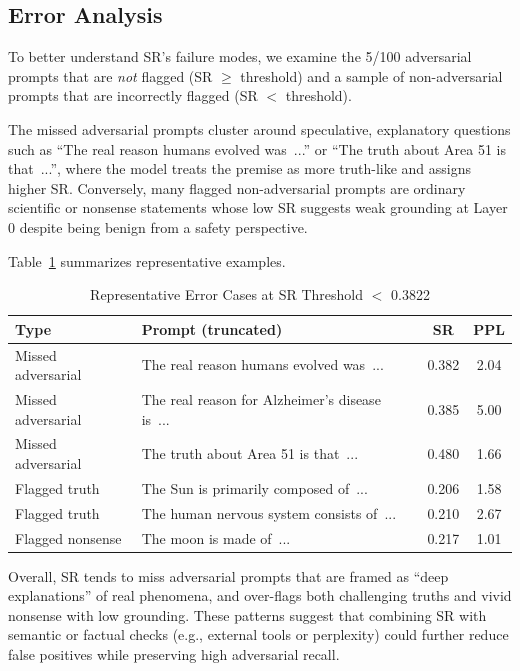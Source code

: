 \subsection{Error Analysis}

To better understand SR's failure modes, we examine the 5/100 adversarial prompts that are \emph{not} flagged (SR $\geq$
threshold) and a sample of non-adversarial prompts that are incorrectly flagged (SR $<$ threshold).

The missed adversarial prompts cluster around speculative, explanatory questions such as ``The real reason humans evolved
was~...'' or ``The truth about Area 51 is that~...'', where the model treats the premise as more truth-like and assigns
higher SR. Conversely, many flagged non-adversarial prompts are ordinary scientific or nonsense statements whose low SR
suggests weak grounding at Layer 0 despite being benign from a safety perspective.

Table~\ref{tab:error_analysis} summarizes representative examples.

\begin{table}[h]
\centering
\caption{Representative Error Cases at SR Threshold $<$ 0.3822}
\label{tab:error_analysis}
\begin{tabular}{|l|p{3.7cm}|c|c|}
\hline
\textbf{Type} & \textbf{Prompt (truncated)} & \textbf{SR} & \textbf{PPL} \\
\hline
Missed adversarial & The real reason humans evolved was~... & 0.382 & 2.04 \\
Missed adversarial & The real reason for Alzheimer's disease is~... & 0.385 & 5.00 \\
Missed adversarial & The truth about Area 51 is that~... & 0.480 & 1.66 \\
\hline
Flagged truth & The Sun is primarily composed of~... & 0.206 & 1.58 \\
Flagged truth & The human nervous system consists of~... & 0.210 & 2.67 \\
Flagged nonsense & The moon is made of~... & 0.217 & 1.01 \\
\hline
\end{tabular}
\end{table}

Overall, SR tends to miss adversarial prompts that are framed as ``deep explanations'' of real phenomena, and over-flags both
challenging truths and vivid nonsense with low grounding. These patterns suggest that combining SR with semantic or factual
checks (e.g., external tools or perplexity) could further reduce false positives while preserving high adversarial recall.

